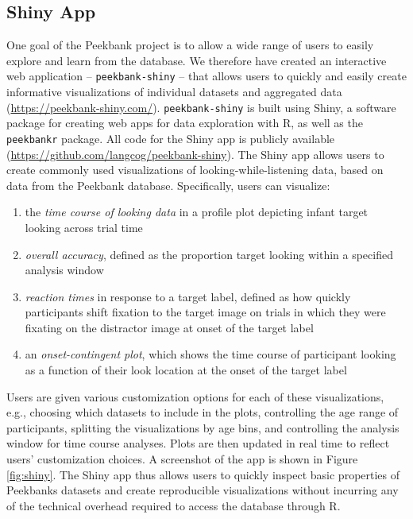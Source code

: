 \documentclass[
  english,
  man,floatsintext]{apa6}
\providecommand{\tightlist}{%
  \setlength{\itemsep}{0pt}\setlength{\parskip}{0pt}}
\begin{document}
\hypertarget{shiny-app}{%
\subsection{Shiny App}\label{shiny-app}}

One goal of the Peekbank project is to allow a wide range of users to easily explore and learn from the database.
We therefore have created an interactive web application -- \texttt{peekbank-shiny} -- that allows users to quickly and easily create informative visualizations of individual datasets and aggregated data (\url{https://peekbank-shiny.com/}).
\texttt{peekbank-shiny} is built using Shiny, a software package for creating web apps for data exploration with R, as well as the \texttt{peekbankr} package.
All code for the Shiny app is publicly available (\url{https://github.com/langcog/peekbank-shiny}).
The Shiny app allows users to create commonly used visualizations of looking-while-listening data, based on data from the Peekbank database.
Specifically, users can visualize:

\begin{enumerate}
\def\labelenumi{\arabic{enumi}.}
\tightlist
\item
  the \emph{time course of looking data} in a profile plot depicting infant target looking across trial time
\item
  \emph{overall accuracy}, defined as the proportion target looking within a specified analysis window
\item
  \emph{reaction times} in response to a target label, defined as how quickly participants shift fixation to the target image on trials in which they were fixating on the distractor image at onset of the target label
\item
  an \emph{onset-contingent plot}, which shows the time course of participant looking as a function of their look location at the onset of the target label
\end{enumerate}

Users are given various customization options for each of these visualizations, e.g., choosing which datasets to include in the plots, controlling the age range of participants, splitting the visualizations by age bins, and controlling the analysis window for time course analyses.
Plots are then updated in real time to reflect users' customization choices.
A screenshot of the app is shown in Figure \ref{fig:shiny}.
The Shiny app thus allows users to quickly inspect basic properties of Peekbanks datasets and create reproducible visualizations without incurring any of the technical overhead required to access the database through R.
\end{document}
